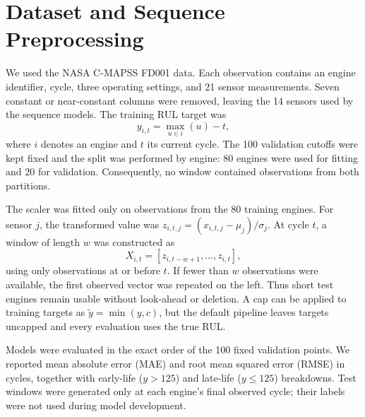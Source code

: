 \section{Dataset and Sequence Preprocessing}
\label{sec:preprocessing}

We used the NASA C-MAPSS FD001 data.  Each observation contains an engine
identifier, cycle, three operating settings, and 21 sensor measurements.
Seven constant or near-constant columns were removed, leaving the 14 sensors
used by the sequence models.  The training RUL target was
\[
y_{i,t}=\max_{u \in i}(u)-t,
\]
where $i$ denotes an engine and $t$ its current cycle.  The 100 validation
cutoffs were kept fixed and the split was performed by engine: 80 engines
were used for fitting and 20 for validation.  Consequently, no window
contained observations from both partitions.

The scaler was fitted only on observations from the 80 training engines.
For sensor $j$, the transformed value was
$z_{i,t,j}=(x_{i,t,j}-\mu_j)/\sigma_j$.  At cycle $t$, a window of length $w$
was constructed as
\[
X_{i,t}=[z_{i,t-w+1},\ldots,z_{i,t}],
\]
using only observations at or before $t$.  If fewer than $w$ observations
were available, the first observed vector was repeated on the left.  Thus
short test engines remain usable without look-ahead or deletion.  A cap can
be applied to training targets as $\tilde y=\min(y,c)$, but the default
pipeline leaves targets uncapped and every evaluation uses the true RUL.

Models were evaluated in the exact order of the 100 fixed validation points.
We reported mean absolute error (MAE) and root mean squared error (RMSE) in
cycles, together with early-life ($y>125$) and late-life ($y\leq125$)
breakdowns.  Test windows were generated only at each engine's final
observed cycle; their labels were not used during model development.
